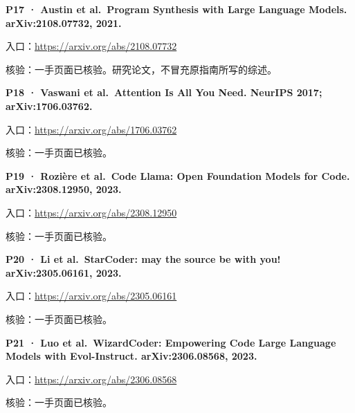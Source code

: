 \par\noindent\begin{minipage}{\linewidth}
\textbf{P17 · Austin et al.~Program Synthesis with Large Language
Models. arXiv:\allowbreak{}2108.07732, 2021.}

入口：\url{https://arxiv.org/abs/2108.07732}

核验：一手页面已核验。研究论文，不冒充原指南所写的综述。
\end{minipage}\par\vspace{6pt}

\par\noindent\begin{minipage}{\linewidth}
\textbf{P18 · Vaswani et al.~Attention Is All You Need. NeurIPS 2017;
arXiv:\allowbreak{}1706.03762.}

入口：\url{https://arxiv.org/abs/1706.03762}

核验：一手页面已核验。
\end{minipage}\par\vspace{6pt}

\par\noindent\begin{minipage}{\linewidth}
\textbf{P19 · Rozière et al.~Code Llama: Open Foundation Models for
Code. arXiv:\allowbreak{}2308.12950, 2023.}

入口：\url{https://arxiv.org/abs/2308.12950}

核验：一手页面已核验。
\end{minipage}\par\vspace{6pt}

\par\noindent\begin{minipage}{\linewidth}
\textbf{P20 · Li et al.~StarCoder: may the source be with you!
arXiv:\allowbreak{}2305.06161, 2023.}

入口：\url{https://arxiv.org/abs/2305.06161}

核验：一手页面已核验。
\end{minipage}\par\vspace{6pt}

\par\noindent\begin{minipage}{\linewidth}
\textbf{P21 · Luo et al.~WizardCoder: Empowering Code Large Language
Models with Evol-Instruct. arXiv:\allowbreak{}2306.08568, 2023.}

入口：\url{https://arxiv.org/abs/2306.08568}

核验：一手页面已核验。
\end{minipage}\par\vspace{6pt}

